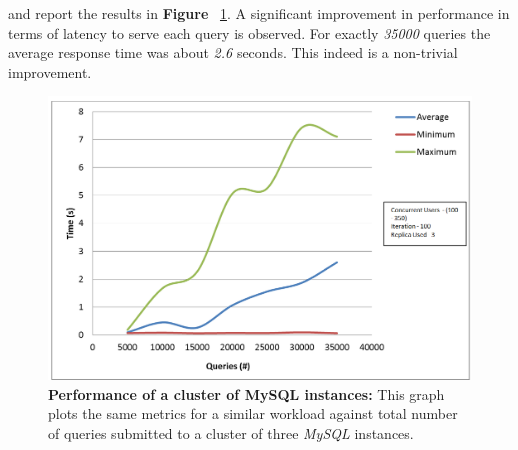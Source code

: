 \documentclass[12pt]{article}
\begin{document}
and report the results in \textbf{Figure }~\ref{fig:scaling}. A significant improvement 
in performance in terms of latency to serve each query is observed.
For exactly \emph{35000} queries the average response time was about \emph{2.6}
seconds. This indeed is a non-trivial improvement.  
\begin{figure}[H] 
\centering
\includegraphics[scale=0.45]{Images/graph_scaling.PNG}
\caption{\textbf{Performance of a cluster of MySQL instances:} This graph plots
the same metrics for a similar workload against total number of queries
submitted to a cluster of three \emph{MySQL} instances. } 
\label{fig:scaling}
\end{figure} 
\end{document}
